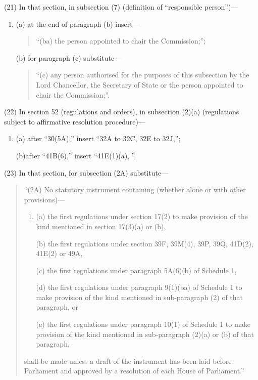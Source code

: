 \documentclass[a4paper]{article}
\begin{document}
(21) In that section, in subsection (7) (definition of “responsible person”)—
\begin{enumerate}\item[]
(a) at the end of paragraph (b) insert—
\begin{quotation}
“(ba) the person appointed to chair the Commission;”;
\end{quotation}

(b) for paragraph (c) substitute—
\begin{quotation}
“(c) any person authorised for the purposes of this subsection by the Lord Chancellor, the Secretary of State or the person appointed to chair the Commission;”.
\end{quotation}
\end{enumerate}

(22) In section 52 (regulations and orders), in subsection (2)(a) (regulations subject to affirmative resolution procedure)—
\begin{enumerate}\item[]
(a) after “30(5A),” insert  “32A to 32C, 32E to 32J,”;

(b)after “41B(6),” insert  “41E(1)(a), ”.
\end{enumerate}

(23) In that section, for subsection (2A) substitute—
\begin{quotation}
“(2A) No statutory instrument containing (whether alone or with other provisions)—
\begin{enumerate}\item[]
(a) the first regulations under section 17(2) to make provision of the kind mentioned in section 17(3)(a) or (b),

(b) the first regulations under section 39F, 39M(4), 39P, 39Q, 41D(2), 41E(2) or 49A,

(c) the first regulations under paragraph 5A(6)(b) of Schedule 1,

(d) the first regulations under paragraph 9(1)(ba) of Schedule 1 to make provision of the kind mentioned in sub-paragraph (2) of that paragraph, or

(e) the first regulations under paragraph 10(1) of Schedule 1 to make provision of the kind mentioned in sub-paragraph (2)(a) or (b) of that paragraph,
\end{enumerate}
shall be made unless a draft of the instrument has been laid before Parliament and approved by a resolution of each House of Parliament.”
\end{quotation}
\end{document}
